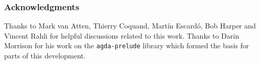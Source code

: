 \documentclass[runningheads,a4paper]{llncs}[2015/06/24]
\begin{document}
\subsubsection*{Acknowledgments}
Thanks to Mark van Atten, Thierry Coquand, Mart\'in Escard\'o, Bob
Harper and Vincent Rahli for helpful discussions related to this
work. Thanks to Darin Morrison for his work on the
\texttt{agda-prelude} library which formed the basis for parts of this
development.




\nocite{van-atten:2004,brouwer:1981}



\end{document}
